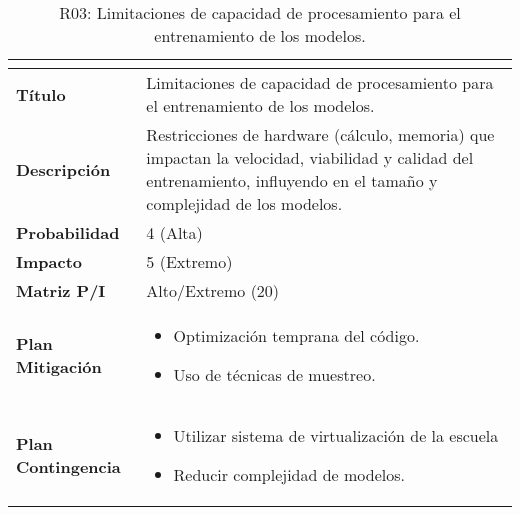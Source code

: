 \begin{table}[H]
\centering
\begin{tabular}{|>{\bfseries}l|p{10cm}|}
\hline
\rowcolor{lightgray}
\multicolumn{2}{|c|}{\textbf{Riesgo R03}} \\ \hline
Título & Limitaciones de capacidad de procesamiento para el entrenamiento de los modelos. \\ \hline
Descripción & Restricciones de hardware (cálculo, memoria) que impactan la velocidad, viabilidad y calidad del entrenamiento, influyendo en el tamaño y complejidad de los modelos.\\ \hline
Probabilidad & 4 (Alta)   \cellcolor{orangerisk}\\ \hline
Impacto & 5 (Extremo)  \cellcolor{redrisk}\\ \hline
Matriz P/I & Alto/Extremo (20)\\ \hline
Plan Mitigación & 
\begin{itemize}
\item Optimización temprana del código.
\item Uso de técnicas de muestreo.
\end{itemize} \\ \hline
Plan Contingencia & 
\begin{itemize}
\item Utilizar sistema de virtualización de la escuela
\item Reducir complejidad de modelos.
\end{itemize} \\ \hline
\end{tabular}
\caption{R03: Limitaciones de capacidad de procesamiento para el entrenamiento de los modelos.}
\label{tab:R03}
\end{table}

